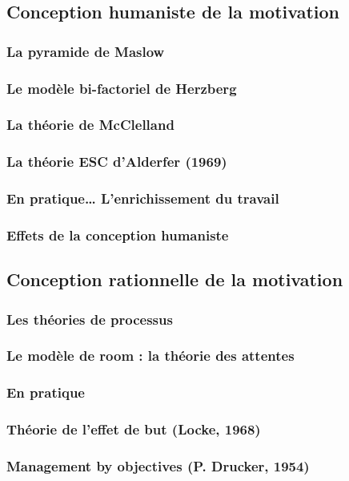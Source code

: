 \documentclass[12pt]{article}
\begin{document}
	\subsection{Conception humaniste de la motivation}
		\subsubsection{La pyramide de Maslow}
		\subsubsection{Le modèle bi-factoriel de Herzberg}
		\subsubsection{La théorie de McClelland}
		\subsubsection{La théorie ESC d’Alderfer (1969)}
		\subsubsection{En pratique… L’enrichissement du travail}
		\subsubsection{Effets de la conception humaniste}
	\subsection{Conception rationnelle de la motivation}
		\subsubsection{Les théories de processus}
		\subsubsection{Le modèle de room : la théorie des attentes}
		\subsubsection{En pratique}
		\subsubsection{Théorie de l’effet de but (Locke, 1968)}
		\subsubsection{Management by objectives (P. Drucker, 1954)}
\end{document}

